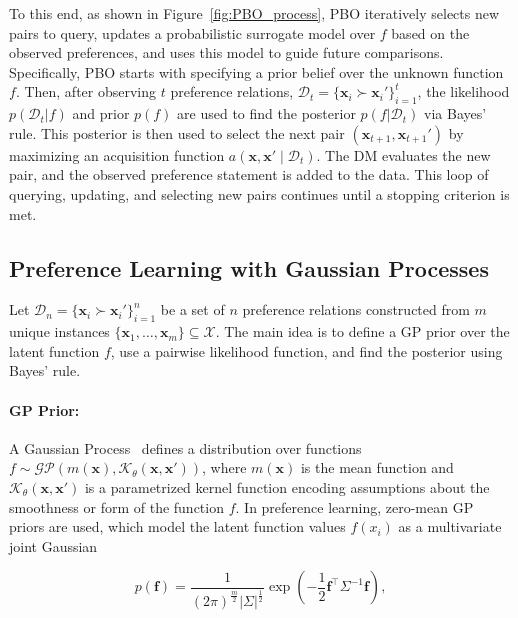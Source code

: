 \documentclass{article}
\begin{document}
To this end, as shown in Figure~\ref{fig:PBO_process}, PBO iteratively selects new pairs to query, updates a probabilistic surrogate model over $f$ based on the observed preferences, and uses this model to guide future comparisons. Specifically, PBO starts with specifying a prior belief over the unknown function $f$. Then, after observing $t$ preference relations, $\mathcal{D}_t = \{ \mathbf{x}_i \succ \mathbf{x}_i' \}_{i=1}^t$, the likelihood $p(\mathcal{D}_t|f)$ and prior $p(f)$ are used to find the posterior $p(f|\mathcal{D}_t)$ via Bayes' rule. This posterior is then used to select the next pair $(\mathbf{x}_{t+1}, \mathbf{x}_{t+1}')$ by maximizing an acquisition function $a(\mathbf{x}, \mathbf{x}' \mid \mathcal{D}_t)$. The DM evaluates the new pair, and the observed preference statement is added to the data. This loop of querying, updating, and selecting new pairs continues until a stopping criterion is met.

\subsection{Preference Learning with Gaussian Processes}\label{sec:bg_prefGP}
Let $\mathcal{D}_n = \{ \mathbf{x}_i \succ \mathbf{x}_i' \}_{i=1}^n$ be a set of $n$ preference relations constructed from $m$ unique instances $\{\mathbf{x}_1, \ldots, \mathbf{x}_m\} \subseteq \mathcal{X}$. The main idea is to define a GP prior over the latent function $f$, use a pairwise likelihood function, and find the posterior using Bayes' rule.

\paragraph{GP Prior:}
A Gaussian Process~\cite{williams1995gaussian} defines a distribution over functions $f \sim \mathcal{GP}(m(\mathbf{x}), \mathcal{K}_{\theta}(\mathbf{x}, \mathbf{x}'))$, where $m(\mathbf{x})$ is the mean function and $\mathcal{K}_\theta(\mathbf{x}, \mathbf{x}')$ is a parametrized kernel function encoding assumptions about the smoothness or form of the function $f$. In preference learning, zero-mean GP priors are used, which model the latent function values $f(x_i)$ as a multivariate joint Gaussian

\begin{equation}\label{eq:prior}
p(\mathbf{f}) = \frac{1}{(2\pi)^{\frac{m}{2}}|\Sigma|^{\frac{1}{2}}} \exp\left(-\frac{1}{2} \mathbf{f}^\top \Sigma^{-1} \mathbf{f}\right),
\end{equation}
\end{document}
